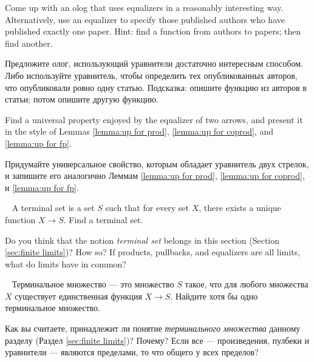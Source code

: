 \begin{exerciseENG}
Come up with an olog that uses equalizers in a reasonably interesting way. Alternatively, use an equalizer to specify those published authors who have published exactly one paper. Hint: find a function from authors to papers; then find another.
\end{exerciseENG}

\begin{exerciseRUS}
Предложите олог, использующий уравнители достаточно интересным способом. Либо используйте уравнитель, чтобы определить тех опубликованных авторов, что опубликовали ровно одну статью. Подсказка: опишите функцию из авторов в статьи; потом опишите другую функцию.
\end{exerciseRUS}

\begin{exerciseENG}
Find a universal property enjoyed by the equalizer of two arrows, and present it in the style of Lemmas \ref{lemma:up for prod}, \ref{lemma:up for coprod}, and \ref{lemma:up for fp}.
\end{exerciseENG}

\begin{exerciseRUS}
Придумайте универсальное свойство, которым обладает уравнитель двух стрелок, и запишите его аналогично Леммам \ref{lemma:up for prod}, \ref{lemma:up for coprod}, и \ref{lemma:up for fp}.
\end{exerciseRUS}

\begin{exerciseENG}~
\sexc A terminal set is a set $S$ such that for every set $X$, there exists a unique function $X\to S$. Find a terminal set. 
\item Do you think that the notion {\em terminal set} belongs in this section (Section \ref{sec:finite limits})? How so? If products, pullbacks, and equalizers are all limits, what do limits have in common?
\endsexc
\end{exerciseENG}

\begin{exerciseRUS}~
\sexc Терминальное множество — это множество $S$ такое, что для любого множества $X$ существует единственная функция $X\to S$. Найдите хотя бы одно терминальное множество. 
\item Как вы считаете, принадлежит ли понятие {\em терминального множества} данному разделу (Раздел \ref{sec:finite limits})? Почему? Если все — произведения, пулбеки и уравнители — являются пределами, то что общего у всех пределов?
\endsexc
\end{exerciseRUS}

